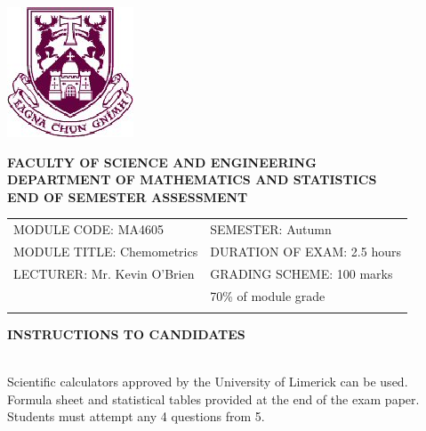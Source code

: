 \documentclass[a4paper,12pt]{article}
\begin{document}
\begin{center}
       \includegraphics[scale=0.55]{shieldtransparent2}
\end{center}

\begin{center}
\vspace{1cm}
\large \bf {FACULTY OF SCIENCE AND ENGINEERING} \\[0.5cm]
\normalsize DEPARTMENT OF MATHEMATICS AND STATISTICS \\[1.25cm]
\large \bf {END OF SEMESTER ASSESSMENT} \\[1.5cm]
\end{center}

\begin{tabular}{ll}
MODULE CODE: MA4605 & SEMESTER: Autumn \\[1cm]
MODULE TITLE: Chemometrics & DURATION OF EXAM: 2.5 hours \\[1cm]
LECTURER: Mr. Kevin O'Brien & GRADING SCHEME: 100 marks \\
& \phantom{GRADING SCHEME:} \footnotesize {70\% of module grade} \\[0.8cm]
\\[1cm]
\end{tabular}
\begin{center}
{\bf INSTRUCTIONS TO CANDIDATES}
\end{center}

{\noindent \\ Scientific calculators approved by the University of Limerick can be used. \\
Formula sheet and statistical tables provided at the end of the exam paper.\\
Students must attempt any 4 questions from 5.}
\newpage
\end{document}
